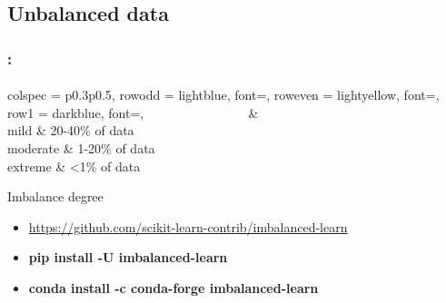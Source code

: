 \documentclass[xcolor=table]{beamer}
\begin{document}
\subsection{Unbalanced data}

\begin{frame}
	\frametitle{\insertshortsubtitle: \insertsection}
	\framesubtitle{\insertsubsection}
	
	\begin{table}
	\begin{tblr}{
			colspec = {p{0.3\textwidth}p{0.5\textwidth}},
			row{odd} = {lightblue, font=\small},
			row{even} = {lightyellow, font=\small},
			row{1} = {darkblue, font=\bfseries},
		}
			\textcolor{white}{Imbalance degree} & \textcolor{white}{Minority class proportion} \\
			mild & 20-40\% of data \\
			moderate & 1-20\% of data \\
			extreme &	\textless 1\% of data \\
	\end{tblr}
	\caption{Imbalance degree \cite{2021-google-prep}}
	\end{table}

	\begin{itemize}
		\item \url{https://github.com/scikit-learn-contrib/imbalanced-learn}
		\item \textbf{pip install -U imbalanced-learn}
		\item \textbf{conda install -c conda-forge imbalanced-learn}
	\end{itemize}
	
\end{frame}
\end{document}
